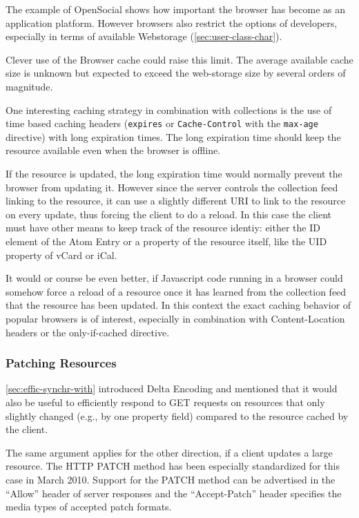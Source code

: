 \documentclass[11pt,a4paper,headsepline,twoside]{scrartcl}		%
\begin{document}
The example of OpenSocial shows how important the browser has become as an
application platform. However browsers also restrict the options of developers,
especially in terms of available Webstorage (\autoref{sec:user-class-char}).

Clever use of the Browser cache could raise this limit. The average available
cache size is unknown but expected to exceed the web-storage size by several
orders of magnitude.

One interesting caching strategy in combination with collections is the use of
time based caching headers (\lstinline:expires: or \lstinline:Cache-Control:
with the \lstinline:max-age: directive) with long expiration times. The long
expiration time should keep the resource available even when the browser is
offline.

If the resource is updated, the long expiration time would normally prevent the
browser from updating it. However since the server controls the collection feed
linking to the resource, it can use a slightly different URI to link to the
resource on every update, thus forcing the client to do a reload. In this case
the client must have other means to keep track of the resource identiy: either
the ID element of the Atom Entry or a property of the resource itself, like the
UID property of vCard or iCal.

It would or course be even better, if Javascript code running in a browser could
somehow force a reload of a resource once it has learned from the collection
feed that the resource has been updated. In this context the exact caching
behavior of popular browsers is of interest, especially in combination with
Content-Location headers or the only-if-cached directive.

\subsubsection{Patching Resources}
\label{sec:patching-resources}

\autoref{sec:effic-synchr-with} introduced Delta Encoding \cite{RFC3229} and
mentioned that it would also be useful to efficiently respond to GET requests on
resources that only slightly changed (e.g., by one property field) compared to
the resource cached by the client.

The same argument applies for the other direction, if a client updates a large
resource. The HTTP PATCH method \cite{RFC5789} has been especially standardized
for this case in March 2010. Support for the PATCH method can be advertised in
the ``Allow'' header of server responses and the ``Accept-Patch'' header
specifies the media types of accepted patch formats.
\end{document}
